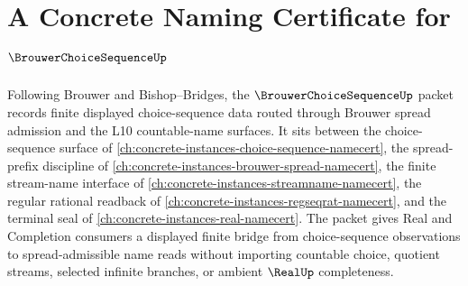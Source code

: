\chapter{A Concrete Naming Certificate for $\BrouwerChoiceSequenceUp$}
\label{ch:concrete-instances-brouwer-choice-sequence-namecert}

Following Brouwer and Bishop--Bridges, the $\BrouwerChoiceSequenceUp$ packet records finite displayed choice-sequence data routed through Brouwer spread admission and the L10 countable-name surfaces. It sits between the choice-sequence surface of \autoref{ch:concrete-instances-choice-sequence-namecert}, the spread-prefix discipline of \autoref{ch:concrete-instances-brouwer-spread-namecert}, the finite stream-name interface of \autoref{ch:concrete-instances-streamname-namecert}, the regular rational readback of \autoref{ch:concrete-instances-regseqrat-namecert}, and the terminal seal of \autoref{ch:concrete-instances-real-namecert}. The packet gives Real and Completion consumers a displayed finite bridge from choice-sequence observations to spread-admissible name reads without importing countable choice, quotient streams, selected infinite branches, or ambient $\RealUp$ completeness.

